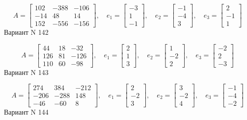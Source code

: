\documentclass[11pt]{report}
\begin{document}
$$A = \left[\begin{matrix}102 & -388 & -106\\-14 & 48 & 14\\152 & -556 & -156\end{matrix}\right],\quad e_1 = \left[\begin{matrix}-3\\1\\-1\end{matrix}\right],\quad e_2 = \left[\begin{matrix}-1\\-4\\3\end{matrix}\right],\quad e_3 = \left[\begin{matrix}2\\-1\\1\end{matrix}\right]$$Вариант N 142

$$A = \left[\begin{matrix}44 & 18 & -32\\126 & 81 & -126\\110 & 60 & -98\end{matrix}\right],\quad e_1 = \left[\begin{matrix}2\\1\\3\end{matrix}\right],\quad e_2 = \left[\begin{matrix}1\\-2\\2\end{matrix}\right],\quad e_3 = \left[\begin{matrix}-2\\2\\-3\end{matrix}\right]$$Вариант N 143

$$A = \left[\begin{matrix}274 & 384 & -212\\-206 & -288 & 148\\-46 & -60 & 8\end{matrix}\right],\quad e_1 = \left[\begin{matrix}2\\-2\\3\end{matrix}\right],\quad e_2 = \left[\begin{matrix}3\\-2\\4\end{matrix}\right],\quad e_3 = \left[\begin{matrix}-1\\-4\\-2\end{matrix}\right]$$Вариант N 144
\end{document}
